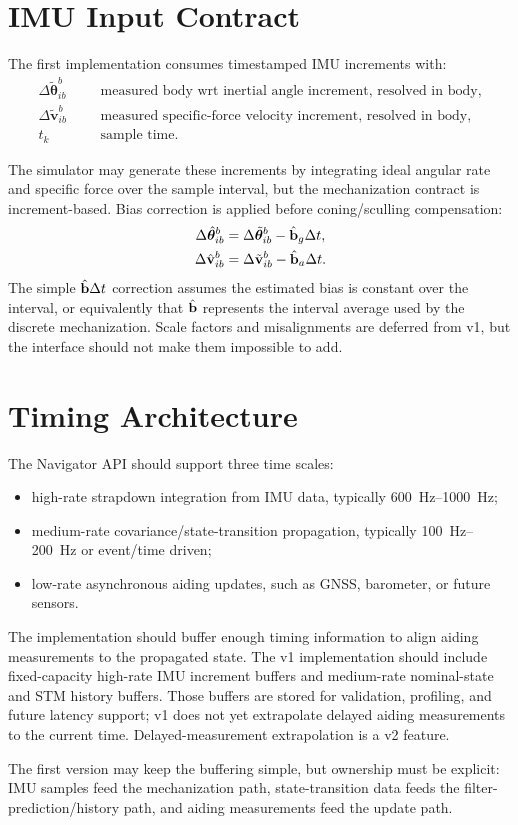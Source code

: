 \section{IMU Input Contract}
\label{sec:imu_input_contract}

The first implementation consumes timestamped IMU increments with:
\begin{align}
\Delta\tilde{\boldsymbol\theta}_{ib}^{b} & && \text{measured body wrt inertial angle increment, resolved in body},\\
\Delta\tilde{\mathbf{v}}_{ib}^{b} & && \text{measured specific-force velocity increment, resolved in body},\\
t_k & && \text{sample time}.
\end{align}

The simulator may generate these increments by integrating ideal angular rate
and specific force over the sample interval, but the mechanization contract is
increment-based. Bias correction is applied before coning/sculling compensation:
\begin{align}
\Delta\hat{\boldsymbol\theta}_{ib}^{b}
&=
\Delta\tilde{\boldsymbol\theta}_{ib}^{b}
-
\hat{\mathbf{b}}_g\Delta t,\\
\Delta\hat{\mathbf{v}}_{ib}^{b}
&=
\Delta\tilde{\mathbf{v}}_{ib}^{b}
-
\hat{\mathbf{b}}_a\Delta t.
\end{align}
The simple $\hat{\mathbf{b}}\Delta t$ correction assumes the estimated bias is constant
over the interval, or equivalently that $\hat{\mathbf{b}}$ represents the interval
average used by the discrete mechanization. Scale factors and misalignments are
deferred from v1, but the interface should not make them impossible to add.

\section{Timing Architecture}

The Navigator API should support three time scales:
\begin{itemize}
    \item high-rate strapdown integration from IMU data, typically
    \SIrange{600}{1000}{\hertz};
    \item medium-rate covariance/state-transition propagation, typically
    \SIrange{100}{200}{\hertz} or event/time driven;
    \item low-rate asynchronous aiding updates, such as GNSS, barometer, or
    future sensors.
\end{itemize}

The implementation should buffer enough timing information to align aiding
measurements to the propagated state. The v1 implementation should include
fixed-capacity high-rate IMU increment buffers and medium-rate nominal-state
and STM history buffers. Those buffers are stored for validation, profiling, and
future latency support; v1 does not yet extrapolate delayed aiding measurements
to the current time. Delayed-measurement extrapolation is a v2 feature.

The first version may keep the buffering simple, but ownership must be explicit:
IMU samples feed the mechanization path, state-transition data feeds the
filter-prediction/history path, and aiding measurements feed the update path.
